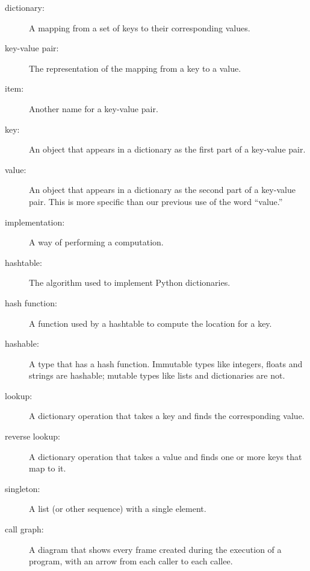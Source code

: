 \documentclass[10pt]{book}
\begin{document}
\begin{description}

\item[dictionary:] A mapping from a set of keys to their
corresponding values.

\item[key-value pair:] The representation of the mapping from
a key to a value.

\item[item:] Another name for a key-value pair.

\item[key:] An object that appears in a dictionary as the
first part of a key-value pair.

\item[value:] An object that appears in a dictionary as the
second part of a key-value pair.  This is more specific than
our previous use of the word ``value.''

\item[implementation:] A way of performing a computation.

\item[hashtable:] The algorithm used to implement Python
dictionaries.

\item[hash function:] A function used by a hashtable to compute the
location for a key.

\item[hashable:] A type that has a hash function.  Immutable
types like integers,
floats and strings are hashable; mutable types like lists and
dictionaries are not.

\item[lookup:] A dictionary operation that takes a key and finds
the corresponding value.

\item[reverse lookup:] A dictionary operation that takes a value and finds
one or more keys that map to it.

\item[singleton:] A list (or other sequence) with a single element.

\item[call graph:] A diagram that shows every frame created during
the execution of a program, with an arrow from each caller to
each callee.


\end{description}
\end{document}
